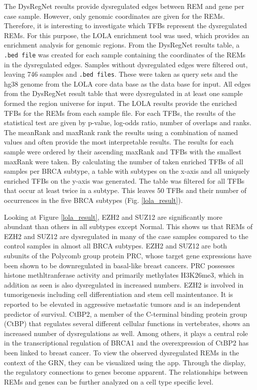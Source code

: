 \documentclass[pdftex,12pt,a4paper]{report}
\begin{document}
The DysRegNet results provide dysregulated edges between REM and gene per case sample. However, only genomic coordinates are given for the REMs. Therefore, it is interesting to investigate which TFBs represent the dysregulated REMs. For this purpose, the LOLA enrichment tool was used, which provides an enrichment analysis for genomic regions. 
From the DysRegNet results table, a \texttt{.bed file} was created for each sample containing the coordinates of the REMs in the dysregulated edges. Samples without dysregulated edges were filtered out, leaving 746 samples and \texttt{.bed files}. These were taken as query sets and the hg38 genome from the LOLA core data base as the data base for input. All edges from the DysRegNet result table that were dysregulated in at least one sample formed the region universe for input. The LOLA results provide the enriched TFBs for the REMs from each sample file. For each TFBs, the results of the statistical test are given by p-value, log-odds ratio, number of overlaps and ranks. The meanRank and maxRank rank the results using a combination of named values and often provide the most interpretable results\cite{LOLA}. 
The results for each sample were ordered by their ascending maxRank and TFBs with the smallest maxRank were taken. By calculating the number of taken enriched TFBs of all samples per BRCA subtype, a table with subtypes on the x-axis and all uniquely enriched TFBs on the y-axis was generated. The table was filtered for all TFBs that occur at least twice in a subtype. This leaves 50 TFBs and their number of occurrences in the five BRCA subtypes (Fig. \ref{lola_result}).

Looking at Figure \ref{lola_result}, EZH2 and SUZ12 are significantly more abundant than others in all subtypes except Normal. This shows us that REMs of EZH2 and SUZ12 are dysregulated in many of the case samples compared to the control samples in almost all BRCA subtypes. EZH2 and SUZ12 are both subunits of the Polycomb group protein PRC, whose target gene expressions have been shown to be downregulated in basal-like breast cancers. PRC possesses histone methltranferase activity and primarily methylates H3K26me3, which in addition as seen is also dysregulated in increased numbers\cite{PRC2}. EZH2 is involved in tumorigenesis including cell differentiation and stem cell maintentance. It is reported to be elevated in aggressive metastatic tumors and is an independent predictor of survival\cite{EZH2}. 
CtBP2, a member of the C-terminal binding protein group (CtBP) that regulates several different cellular functions in vertebrates, shows an increased number of dysregulations as well\cite{CtBP2_general}. Among others, it plays a central role in the transcriptional regulation of BRCA1 and the overexpression of CtBP2 has been linked to breast cancer\cite{CtBP2}. 
To view the observed dysregulated REMs in the context of the GRN, they can be visualized using the app. Through the display, the regulatory connections to genes become apparent. The relationships between REMs and genes can be further analyzed on a cell type specific level. 
\end{document}
